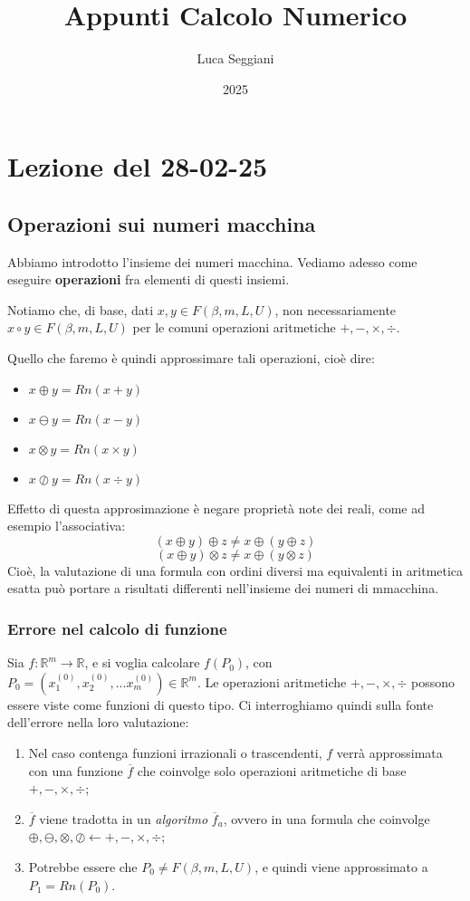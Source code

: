 \documentclass[a4paper,11pt]{article}
\title{Appunti Calcolo Numerico}
\author{Luca Seggiani}
\date{2025}
\begin{document}
\section{Lezione del 28-02-25}

\thispagestyle{empty}
\pagestyle{fancy}

\subsection{Operazioni sui numeri macchina}
Abbiamo introdotto l'insieme dei numeri macchina.
Vediamo adesso come eseguire \textbf{operazioni} fra elementi di questi insiemi.

Notiamo che, di base, dati $x, y \in F(\beta, m, L, U)$, non necessariamente $x \circ y \in F(\beta, m, L, U)$ per le comuni operazioni aritmetiche $+, -, \times, \div$.

Quello che faremo è quindi approssimare tali operazioni, cioè dire:
\begin{itemize}
	\item $x \oplus y = Rn(x + y)$
	\item $x \ominus y = Rn(x - y)$
	\item $x \otimes y = Rn(x \times y)$
	\item $x \oslash y = Rn(x \div y)$
\end{itemize}

Effetto di questa approsimazione è negare proprietà note dei reali, come ad esempio l'associativa:
$$
(x \oplus y) \oplus z \neq x \oplus (y \oplus z)
$$
$$
(x \oplus y) \otimes z \neq x \oplus (y \otimes z)
$$
Cioè, la valutazione di una formula con ordini diversi ma equivalenti in aritmetica esatta può portare a risultati differenti nell'insieme dei numeri di mmacchina.

\subsubsection{Errore nel calcolo di funzione}
Sia $f:\mathbb{R}^m \rightarrow \mathbb{R}$, e si voglia calcolare $f(P_0)$, con $P_0 =\left(x_1^{(0)}, x_2^{(0)}, ...x_m^{(0)}\right) \in \mathbb{R}^m$.
Le operazioni aritmetiche $+, -, \times, \div$ possono essere viste come funzioni di questo tipo.
Ci interroghiamo quindi sulla fonte dell'errore nella loro valutazione:
\begin{enumerate}
	\item Nel caso contenga funzioni irrazionali o trascendenti, $f$ verrà approssimata con una funzione $\overline{f}$ che coinvolge solo operazioni aritmetiche di base $+, -, \times, \div$;
	\item $\overline{f}$ viene tradotta in un \textit{algoritmo} $\overline{f}_a$, ovvero in una formula che coinvolge $\oplus, \ominus, \otimes, \oslash \leftarrow +, -, \times, \div$;
	\item Potrebbe essere che $P_0 \neq F(\beta, m, L, U)$, e quindi viene approssimato a $P_1 = Rn(P_0)$.
\end{enumerate}
\end{document}
